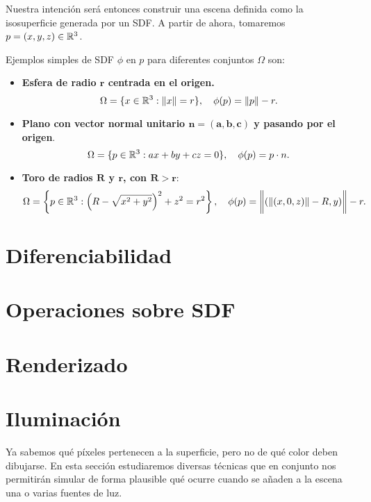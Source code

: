 Nuestra intención será entonces construir una escena definida como la isosuperficie generada por un SDF. A partir de ahora, tomaremos $p=(x,y,z)\in\mathbb{R}^3$.

\begin{ejemplo}\label{ej:sdf}
    Ejemplos simples de SDF $\phi$ en $p$ para diferentes conjuntos $\Omega$ son:
    \begin{itemize}
        \item \textbf{Esfera de radio $\boldsymbol{r}$ centrada en el origen.}
        \begin{equation*}
            \Omega=\{x\in \mathbb{R}^3 : \Vert x\Vert = r\},\quad \phi(p) = \Vert p\Vert - r.
        \end{equation*}
        \item \textbf{Plano con vector normal unitario $\boldsymbol{n=(a,b,c)}$ y pasando por el origen}.
        \begin{equation*}
            \Omega=\{p\in\mathbb{R}^3 : ax+by+cz = 0\},\quad \phi(p) = p\cdot n.
        \end{equation*}
        \item \textbf{Toro de radios $\boldsymbol{R}$ y $\boldsymbol{r}$, con $\boldsymbol{R>r}$}:
        \begin{equation*}
            \Omega=\left\{p\in \mathbb{R}^3 : \left(R-\sqrt{x^2+y^2}\right)^2 + z^2 = r^2\right\},\quad \phi(p)= \bigg\Vert (\Vert(x,0,z)\Vert - R, y) \bigg\Vert - r.
        \end{equation*}
    \end{itemize}
\end{ejemplo}

\section{Diferenciabilidad}


\section{Operaciones sobre SDF}\label{sec:operaciones}


\section{Renderizado}


\section{Iluminación}
Ya sabemos qué píxeles pertenecen a la superficie, pero no de qué color deben dibujarse. En esta sección estudiaremos diversas técnicas que en conjunto nos permitirán simular de forma plausible qué ocurre cuando se añaden a la escena una o varias fuentes de luz.

